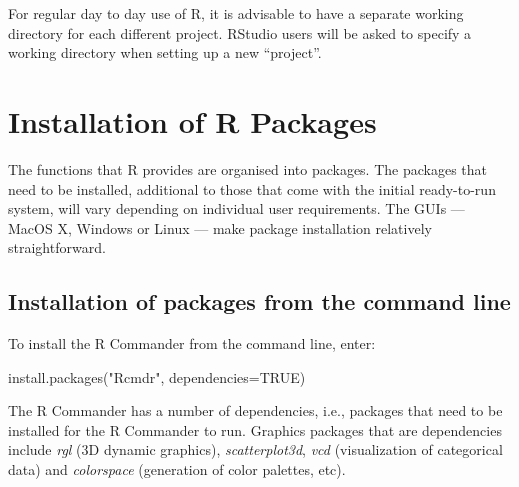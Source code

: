\documentclass{tufte-book}\usepackage[]{graphicx}\usepackage[]{color}
\begin{document}
For regular day to day use of R,
it is advisable to have a separate working
directory for each different project.
RStudio users will be asked to specify
a working directory when setting up a new ``project''.

\section{Installation of R Packages}\label{sec:pkgs}

\noindent
{}
\vspace*{6pt}

The functions that R provides are organised into packages.  The
packages that need to be installed, additional to those that come with
the initial ready-to-run system, will vary depending on individual
user requirements.  The GUIs --- MacOS X, Windows or Linux --- make
package installation relatively straightforward.

\subsection*{Installation of packages from the command line}

To install the R Commander from the command line, enter:
\begin{Schunk}
\begin{Sinput}
install.packages("Rcmdr", dependencies=TRUE)
\end{Sinput}
\end{Schunk}
The R Commander has a number of dependencies, i.e., packages that
need to be installed for the R Commander to run.  Graphics packages
that are dependencies include \textit{rgl} (3D dynamic graphics),
\textit{scatterplot3d}, \textit{vcd} (visualization of categorical
data) and \textit{colorspace} (generation of color palettes, etc).
\end{document}
